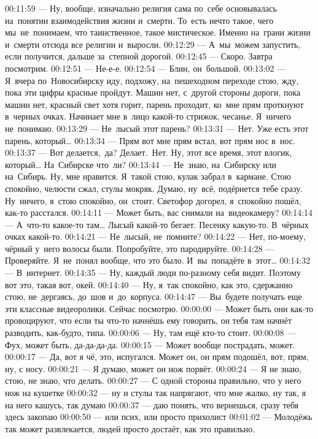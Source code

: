 00:11:59 — Ну, вообще, изначально религия сама по себе основывалась на понятии взаимодействия жизни и смерти. То есть нечто такое, чего мы не понимаем, что таинственное, такое мистическое. Именно на грани жизни и смерти отсюда все религии и выросли.
00:12:29 — А мы можем запустить, если получится, дальше за степной дорогой.
00:12:45 — Скоро. Завтра посмотрим.
00:12:51 — Не-е-е.
00:12:54 — Блин, он большой.
00:13:02 — Я вчера по Новосибирску иду, подхожу, на пешеходном переходе стою, жду, пока эти цифры красные пройдут. Машин нет, с другой стороны дороги, пока машин нет, красный свет хотя горит, парень проходит, ко мне прям проткнуют в черных очках. Начинает мне в лицо какой-то стрижок, чесанье. Я ничего не понимаю.
00:13:29 — Не лысый этот парень?
00:13:31 — Нет. Уже есть этот парень, который…
00:13:34 — Прям вот мне прям встал, вот прям нос в нос.
00:13:37 — Вот делается, да? Делает. Нет. Ну, этот все время, этот влогик, который… На Сибирске что ли?
00:13:44 — Не знаю, на Сибирску или на Сибирь. Ну, мне нравится. Я такой стою, кулак забрал в кармане. Стою спокойно, челюсти сжал, стулы мокряк. Думаю, ну всё, подёрнется тебе сразу. Ну ничего, я стою спокойно, он стоит. Светофор догорел, я спокойно пошёл, как-то расстался.
00:14:11 — Может быть, вас снимали на видеокамеру?
00:14:14 — А что-то какое-то там… Лысый какой-то бегает. Песенку какую-то. В чёрных очках какой-то.
00:14:21 — Не лысый, не помните?
00:14:22 — Нет, по-моему, чёрный у него волосы были. Попробуйте, это пародируйте.
00:14:28 — Проверяйте. Я не понял вообще, что это было. И вы попадёте в этот…
00:14:32 — В интернет.
00:14:35 — Ну, каждый люди по-разному себя видит. Поэтому вот это, такая вот, окей.
00:14:40 — Ну, я так спокойно, как это, сдержанно стою, не дергаясь, до шов и до корпуса.
00:14:47 — Вы будете получать еще эти классные видеоролики. Сейчас посмотрю.
00:00:00 — Может быть они как-то провоцируют, что если ты что-то начнёшь ему говорить, он тебя там начнёт разводить, как-будто, типа.
00:00:06 — Ну, там ещё кто-то стоит.
00:00:08 — Фух, может быть, да-да-да-да.
00:00:15 — Может вообще пострадать, может.
00:00:17 — Да, вот я чё, это, испугался. Может он, он прям подошёл, вот, прям, ну, с носу.
00:00:21 — Я думаю, может он нож порвёт.
00:00:24 — Я не знаю, стою, не знаю, что делать.
00:00:27 — С одной стороны правильно, что у него нож на кушетке
00:00:32 — ну и стулы так напрягают, что мне жалко, ну так, я на него кашусь, так думаю
00:00:37 — даю понять, что вернешься, сразу тебя здесь закопаю
00:00:50 — или псих, или просто прихолист
00:01:02 — Молодёжь так может развлекается, людей просто достаёт, как это правильно.
